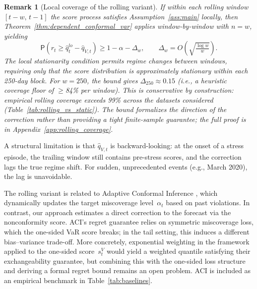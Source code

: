 \documentclass[preprint,11pt,authoryear]{elsarticle}
\newtheorem{remark}[theorem]{Remark}
\renewcommand{\P}{\mathsf{P}}
\newcommand{\1}{\boldsymbol{1}}
\begin{document}
	\begin{remark}[Local coverage of the rolling variant]
		\label{rem:rolling_coverage}
		If within each rolling window $[t-w,\, t-1]$ the score process satisfies Assumption~\ref{ass:main} locally, then Theorem~\ref{thm:dependent_conformal_var} applies window-by-window with $n = w$, yielding
		\[
		\P\!\left(r_t \geq \hat{q}_t^{lo} - \hat{q}_{V,t}\right) \geq 1 - \alpha - \Delta_w, \qquad \Delta_w = O\!\left(\sqrt{\tfrac{\log w}{w}}\right).
		\]
		The local stationarity condition permits regime changes \emph{between} windows, requiring only that the score distribution is approximately stationary within each 250-day block. For $w = 250$, the bound gives $\Delta_{250} \approx 0.15$ (i.e., a heuristic coverage floor of $\geq$84\% per window). This is conservative by construction: empirical rolling coverage exceeds 99\% across the datasets considered (Table~\ref{tab:rolling_vs_static}). The bound formalizes the direction of the correction rather than providing a tight finite-sample guarantee; the full proof is in Appendix~\ref{app:rolling_coverage}.
	\end{remark}

	A structural limitation is that $\hat{q}_{V,t}$ is
	backward-looking: at the onset of a stress episode, the trailing
	window still contains pre-stress scores, and the correction
	lags the true regime shift. For sudden, unprecedented
	events (e.g., March 2020), the lag is unavoidable.

	The rolling variant is related to Adaptive Conformal Inference \citep{gibbs2021adaptive}, which dynamically updates the target miscoverage level~$\alpha_t$ based on past violations. In contrast, our approach estimates a direct correction to the forecast via the nonconformity score. ACI's regret guarantee relies on symmetric miscoverage loss, which the one-sided VaR score breaks; in the tail setting, this induces a different bias--variance trade-off. More concretely, exponential weighting in the \citet{barber2023conformal} framework applied to the one-sided score~$s_t^V$ would yield a weighted quantile satisfying their exchangeability guarantee, but combining this with the one-sided loss structure and deriving a formal regret bound remains an open problem. ACI is included as an empirical benchmark in Table~\ref{tab:baselines}.

\end{document}
